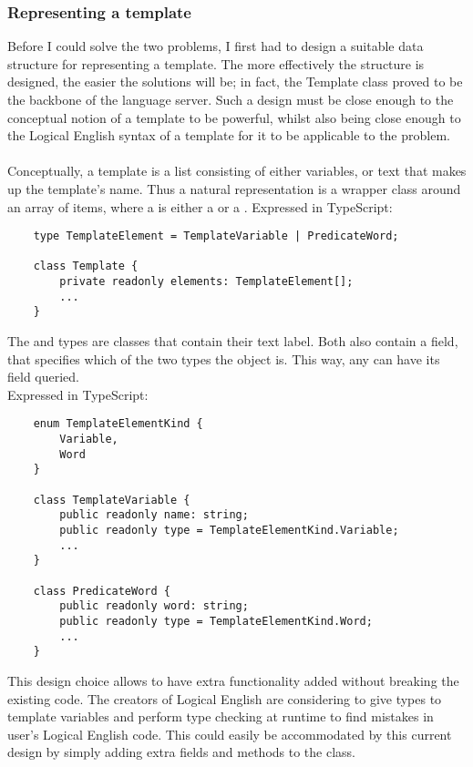 \documentclass[../main.tex]{subfiles}
\begin{document}
\subsubsection{Representing a template}
Before I could solve the two problems, I first had to design a suitable data structure for representing a template. The more effectively the structure is designed, the easier the solutions will be; in fact, the Template class proved to be the backbone of the language server. Such a design must be close enough to the conceptual notion of a template to be powerful, whilst also being close enough to the Logical English syntax of a template for it to be applicable to the problem. 
\\ 
\\
Conceptually, a template is a list  consisting of either variables, or text that makes up the template's name. Thus a natural representation is a wrapper class around an array of  items, where a  is either a  or a . Expressed in TypeScript:

\begin{lstlisting}
    type TemplateElement = TemplateVariable | PredicateWord;

    class Template {
        private readonly elements: TemplateElement[];
        ...
    }
\end{lstlisting}
The  and  types are classes that contain their text label. Both also contain a  field, that specifies which of the two types the object is. This way, any  can have its  field queried. \\
Expressed in TypeScript:

\begin{lstlisting}
    enum TemplateElementKind { 
        Variable,
        Word
    }

    class TemplateVariable {
        public readonly name: string;
        public readonly type = TemplateElementKind.Variable;
        ...
    }

    class PredicateWord {
        public readonly word: string;
        public readonly type = TemplateElementKind.Word;
        ...
    }
\end{lstlisting}
This design choice allows  to have extra functionality added without breaking the existing code. The creators of Logical English are considering to give types to template variables and perform type checking at runtime to find mistakes in user's Logical English code. This could easily be accommodated by this current design by simply adding extra fields and methods to the  class.
\end{document}
